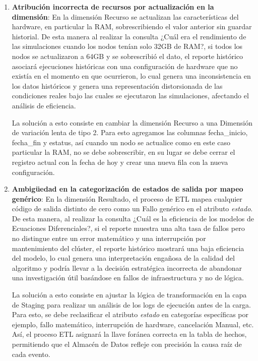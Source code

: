     \begin{enumerate}
        \item \textbf{Atribución incorrecta de recursos por actualización en la dimensión}: En la dimensión Recurso se actualizan las características del hardware, en particular la RAM, sobrescribiendo el valor anterior sin guardar historial.   De esta manera al realizar la consulta ¿Cuál era el rendimiento de las simulaciones cuando los nodos tenían solo 32GB de RAM?, si todos los nodos se actualizaron a 64GB y se sobrescribió el dato, el reporte histórico asociará ejecuciones históricas con una configuración de hardware que no existía en el momento en que ocurrieron, lo cual genera una inconsistencia en los datos históricos y genera una representación distorsionada de las condiciones reales bajo las cuales se ejecutaron las simulaciones, afectando el análisis de eficiencia.

        La solución a esto consiste en cambiar la dimensión Recurso a una Dimensión de variación lenta de tipo 2. Para esto agregamos las columnas fecha\_inicio, fecha\_fin y estatus, así cuando un nodo se actualice como en este caso particular la RAM, no se debe sobrescribir, en su lugar se debe cerrar el registro actual con la fecha de hoy y crear una nueva fila con la nueva configuración.

        \item \textbf{Ambigüedad en la categorización de estados de salida por mapeo genérico}: En la dimensión Resultado, el proceso de ETL mapea cualquier código de salida distinto de cero como un Fallo genérico en el atributo \textit{estado}. De esta manera, al realizar la consulta ¿Cuál es la eficiencia de los modelos de Ecuaciones Diferenciales?, si el reporte muestra una alta tasa de fallos pero no distingue entre un error matemático y una interrupción por mantenimiento del clúster, el reporte histórico mostrará una baja eficiencia del modelo, lo cual genera una interpretación engañosa de la calidad del algoritmo y podría llevar a la decisión estratégica incorrecta de abandonar una investigación útil basándose en fallos de infraestructura y no de lógica.

        La solución a esto consiste en ajustar la lógica de transformación en la capa de Staging para realizar un análisis de los logs de ejecución antes de la carga. Para esto, se debe reclasificar el atributo \textit{estado} en categorías específicas por ejemplo, fallo matemático, interrupción de hardware, cancelación Manual, etc. Así, el proceso ETL asignará la llave foránea correcta en la tabla de hechos, permitiendo que el Almacén de Datos refleje con precisión la causa raíz de cada evento.
    \end{enumerate}


